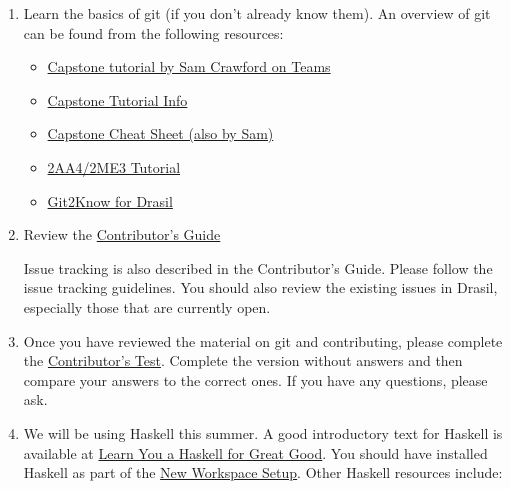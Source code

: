 \documentclass[12pt]{article}
\begin{document}
\begin{enumerate}
\item Learn the basics of git (if you don't already know them).  An overview of
git can be found from the following resources:

\begin{itemize} \item
\href{https://mcmasteru365.sharepoint.com/:v:/r/sites/SummerDrasil/Shared\%20Documents/General/Recordings/Git\%20Tutorial-20220912_143247-Meeting\%20Recording.mp4?csf=1&web=1&e=AmDDmv}
{Capstone tutorial by Sam Crawford on Teams}

\item
\href{https://gitlab.cas.mcmaster.ca/courses/capstone/-/tree/main/Tutorials/T01_GitGitHub}
{Capstone Tutorial Info}

\item
\href{https://gitlab.cas.mcmaster.ca/courses/capstone/-/blob/main/Tutorials/T01_GitGitHub/Git\%20Cheatsheet.pdf}
{Capstone Cheat Sheet (also by Sam)}

\item
\href{https://gitlab.cas.mcmaster.ca/smiths/se2aa4_cs2me3/-/tree/master/Tutorials/T01a-VM-VersionControl/slides}
{2AA4/2ME3 Tutorial}

\item \href{https://github.com/JacquesCarette/Drasil/wiki/Git2Know-for-Drasil}
{Git2Know for Drasil}
\end{itemize}

\item Review the \href{https://github.com/JacquesCarette/Drasil/wiki/Contributor's-Guide} {Contributor's Guide}

Issue tracking is also described in the Contributor's Guide.  Please follow the
issue tracking guidelines. You should also review the existing issues in Drasil,
especially those that are currently open.

\item Once you have reviewed the material on git and contributing, please
complete the
\href{https://github.com/JacquesCarette/Drasil/blob/main/doc/Contributor's\%20Test/ContributorTest.pdf}
{Contributor's Test}.  Complete the version without answers and then compare
your answers to the correct ones.  If you have any questions, please ask.

\item We will be using Haskell this summer.  A good introductory text for
Haskell is available at \href{https://learnyouahaskell.github.io/} {Learn You a Haskell
for Great Good}.  You should have installed Haskell as part of the
\href{https://github.com/JacquesCarette/Drasil/wiki/New-Workspace-Setup} {New
Workspace Setup}.  Other Haskell resources include:


\end{enumerate}
\end{document}
